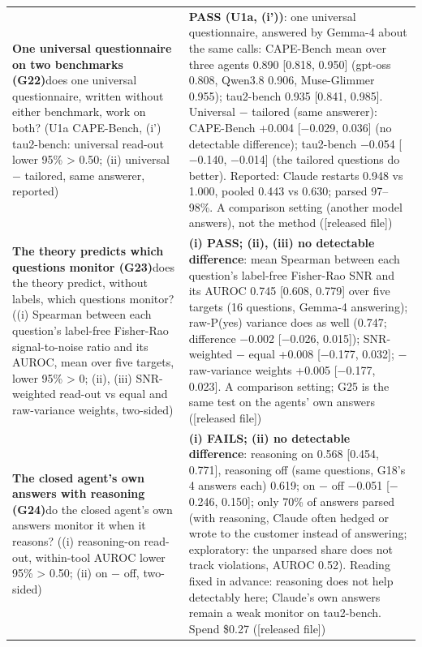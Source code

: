 {\begin{longtable}{p{}p{}}
\textbf{One universal questionnaire on two benchmarks (G22)}\newline does one universal questionnaire, written without either benchmark, work on both? (U1a CAPE-Bench, (i') tau2-bench: universal read-out lower 95\% > 0.50; (ii) universal $-$ tailored, same answerer, reported) & \textbf{PASS (U1a, (i'))}: one universal questionnaire, answered by Gemma-4 about the same calls: CAPE-Bench mean over three agents 0.890 [0.818, 0.950] (gpt-oss 0.808, Qwen3.8 0.906, Muse-Glimmer 0.955); tau2-bench 0.935 [0.841, 0.985]. Universal $-$ tailored (same answerer): CAPE-Bench +0.004 [$-$0.029, 0.036] (no detectable difference); tau2-bench $-$0.054 [$-$0.140, $-$0.014] (the tailored questions do better). Reported: Claude restarts 0.948 vs 1.000, pooled 0.443 vs 0.630; parsed 97--98\%. A comparison setting (another model answers), not the method ([released file])\\[2pt]
\textbf{The theory predicts which questions monitor (G23)}\newline does the theory predict, without labels, which questions monitor? ((i) Spearman between each question's label-free Fisher-Rao signal-to-noise ratio and its AUROC, mean over five targets, lower 95\% > 0; (ii), (iii) SNR-weighted read-out vs equal and raw-variance weights, two-sided) & \textbf{(i) PASS; (ii), (iii) no detectable difference}: mean Spearman between each question's label-free Fisher-Rao SNR and its AUROC 0.745 [0.608, 0.779] over five targets (16 questions, Gemma-4 answering); raw-P(yes) variance does as well (0.747; difference $-$0.002 [$-$0.026, 0.015]); SNR-weighted $-$ equal +0.008 [$-$0.177, 0.032]; $-$ raw-variance weights +0.005 [$-$0.177, 0.023]. A comparison setting; G25 is the same test on the agents' own answers ([released file])\\[2pt]
\textbf{The closed agent's own answers with reasoning (G24)}\newline do the closed agent's own answers monitor it when it reasons? ((i) reasoning-on read-out, within-tool AUROC lower 95\% > 0.50; (ii) on $-$ off, two-sided) & \textbf{(i) FAILS; (ii) no detectable difference}: reasoning on 0.568 [0.454, 0.771], reasoning off (same questions, G18's 4 answers each) 0.619; on $-$ off $-$0.051 [$-$0.246, 0.150]; only 70\% of answers parsed (with reasoning, Claude often hedged or wrote to the customer instead of answering; exploratory: the unparsed share does not track violations, AUROC 0.52). Reading fixed in advance: reasoning does not help detectably here; Claude's own answers remain a weak monitor on tau2-bench. Spend \$0.27 ([released file])\\[2pt]

\end{longtable}}
